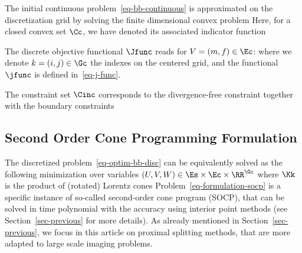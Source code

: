 The initial continuous problem~\eqref{eq-bb-continuous} is approximated on the discretization grid by solving the finite dimensional convex problem
Here, for a closed convex set $\Cc$, we have denoted its associated indicator function

The discrete objective functional $\Jfunc$ reads for $V=(m,f) \in \Ec$:
where we denote $k=(i,j) \in \Gc$ the indexes on the centered grid, and the functional $\jfunc$ is defined in~\eqref{eq-j-func}.

The constraint set $\Cinc$ corresponds to the divergence-free constraint together with the boundary constraints



\subsection{Second Order Cone Programming Formulation}
\label{sec-socp}

The discretized problem~\eqref{eq-optim-bb-disc} can be equivalently solved as the following minimization over variables $(U,V,W) \in \Es \times \Ec \times \RR^{\Gc}$
where $\Kk$ is the product of (rotated) Lorentz cones 
Problem~\eqref{eq-formulation-socp} is a specific instance of so-called second-order cone program (SOCP), that can be solved in time polynomial with the accuracy using interior point methods (see Section~\ref{sec-previous} for more details). As already mentioned in Section~\ref{sec-previous}, we focus in this article on proximal splitting methods, that are more adapted to large scale imaging problems. 



